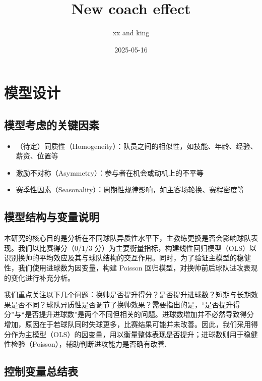 \documentclass[
]{ctexart}
\title{New coach effect}
\author{xx and king}
\date{2025-05-16}
\providecommand{\tightlist}{%
  \setlength{\itemsep}{0pt}\setlength{\parskip}{0pt}}\usepackage{longtable,booktabs,array}
\begin{document}
\maketitle


\section{模型设计}\label{ux6a21ux578bux8bbeux8ba1}

\subsection{模型考虑的关键因素}\label{ux6a21ux578bux8003ux8651ux7684ux5173ux952eux56e0ux7d20}

\begin{itemize}
\tightlist
\item
  （待定）同质性（Homogeneity）：队员之间的相似性，如技能、年龄、经验、薪资、位置等
\item
  激励不对称（Asymmetry）：参与者在机会或动机上的不平等
\item
  赛季性因素（Seasonality）：周期性规律影响，如主客场轮换、赛程密度等
\end{itemize}

\subsection{模型结构与变量说明}\label{ux6a21ux578bux7ed3ux6784ux4e0eux53d8ux91cfux8bf4ux660e}

本研究的核心目的是分析在不同球队异质性水平下，主教练更换是否会影响球队表现。我们以比赛得分（0/1/3
分）为主要衡量指标，构建线性回归模型（OLS）以识别换帅的平均效应及其与球队结构的交互作用。同时，为了验证主模型的稳健性，我们使用进球数为因变量，构建
Poisson 回归模型，对换帅前后球队进攻表现的变化进行补充分析。

我们重点关注以下几个问题：换帅是否提升得分？是否提升进球数？短期与长期效果是否不同？球队异质性是否调节了换帅效果？需要指出的是，``是否提升得分''与``是否提升进球数''是两个不同但相关的问题。进球数增加并不必然导致得分增加，原因在于若球队同时失球更多，比赛结果可能并未改善。因此，我们采用得分作为主模型（OLS）的因变量，用以衡量整体表现是否提升；进球数则用于稳健性检验（Poisson），辅助判断进攻能力是否确有改善.

\subsection{控制变量总结表}\label{ux63a7ux5236ux53d8ux91cfux603bux7ed3ux8868}
\end{document}

